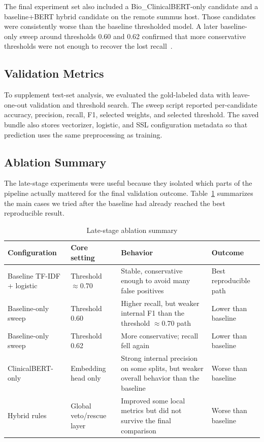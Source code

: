 \documentclass[journal]{IEEEtran}
\begin{document}
The final experiment set also included a Bio\_ClinicalBERT-only candidate and a baseline+BERT hybrid candidate on the remote summus host. Those candidates were consistently worse than the baseline thresholded model. A later baseline-only sweep around thresholds 0.60 and 0.62 confirmed that more conservative thresholds were not enough to recover the lost recall~\cite{clinicalbert}.

\subsection{Validation Metrics}

To supplement test-set analysis, we evaluated the gold-labeled data with leave-one-out validation and threshold search. The sweep script reported per-candidate accuracy, precision, recall, F1, selected weights, and selected threshold. The saved bundle also stores vectorizer, logistic, and SSL configuration metadata so that prediction uses the same preprocessing as training.

\subsection{Ablation Summary}

The late-stage experiments were useful because they isolated which parts of the pipeline actually mattered for the final validation outcome. Table~\ref{tab:ablation} summarizes the main cases we tried after the baseline had already reached the best reproducible result.

\begin{table}[h]
\caption{Late-stage ablation summary}
\label{tab:ablation}
\centering
\scriptsize
\setlength{\tabcolsep}{2pt}
\begin{tabular}{|p{}|p{}|p{}|p{}|}
\hline
Configuration & Core setting & Behavior & Outcome \\
\hline
Baseline TF-IDF + logistic & Threshold $\approx 0.70$ & Stable, conservative enough to avoid many false positives & Best reproducible path \\
\hline
Baseline-only sweep & Threshold 0.60 & Higher recall, but weaker internal F1 than the threshold $\approx 0.70$ path & Lower than baseline \\
\hline
Baseline-only sweep & Threshold 0.62 & More conservative; recall fell again & Lower than baseline \\
\hline
ClinicalBERT-only & Embedding head only & Strong internal precision on some splits, but weaker overall behavior than the baseline & Worse than baseline \\
\hline
Hybrid rules & Global veto/rescue layer & Improved some local metrics but did not survive the final comparison & Worse than baseline \\
\hline
\end{tabular}
\end{table}
\end{document}
